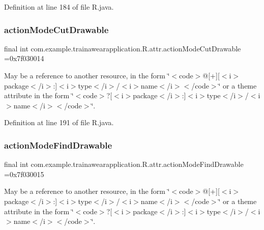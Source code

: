 Definition at line 184 of file R.\+java.

\mbox{\label{classcom_1_1example_1_1trainawearapplication_1_1_r_1_1attr_acd32388d0cfd32221f99f94c27ac47f3}} 
\subsubsection{\texorpdfstring{actionModeCutDrawable}{actionModeCutDrawable}}
{\footnotesize\ttfamily final int com.\+example.\+trainawearapplication.\+R.\+attr.\+action\+Mode\+Cut\+Drawable =0x7f030014\hspace{0.3cm}{\ttfamily [static]}}

May be a reference to another resource, in the form \char`\"{}$<$code$>$@\mbox{[}+\mbox{]}\mbox{[}$<$i$>$package$<$/i$>$\+:\mbox{]}$<$i$>$type$<$/i$>$/$<$i$>$name$<$/i$>$$<$/code$>$\char`\"{} or a theme attribute in the form \char`\"{}$<$code$>$?\mbox{[}$<$i$>$package$<$/i$>$\+:\mbox{]}$<$i$>$type$<$/i$>$/$<$i$>$name$<$/i$>$$<$/code$>$\char`\"{}. 

Definition at line 191 of file R.\+java.

\mbox{\label{classcom_1_1example_1_1trainawearapplication_1_1_r_1_1attr_aa4ec155d8fccfdb751555e622a1d5ddb}} 
\subsubsection{\texorpdfstring{actionModeFindDrawable}{actionModeFindDrawable}}
{\footnotesize\ttfamily final int com.\+example.\+trainawearapplication.\+R.\+attr.\+action\+Mode\+Find\+Drawable =0x7f030015\hspace{0.3cm}{\ttfamily [static]}}

May be a reference to another resource, in the form \char`\"{}$<$code$>$@\mbox{[}+\mbox{]}\mbox{[}$<$i$>$package$<$/i$>$\+:\mbox{]}$<$i$>$type$<$/i$>$/$<$i$>$name$<$/i$>$$<$/code$>$\char`\"{} or a theme attribute in the form \char`\"{}$<$code$>$?\mbox{[}$<$i$>$package$<$/i$>$\+:\mbox{]}$<$i$>$type$<$/i$>$/$<$i$>$name$<$/i$>$$<$/code$>$\char`\"{}. 

